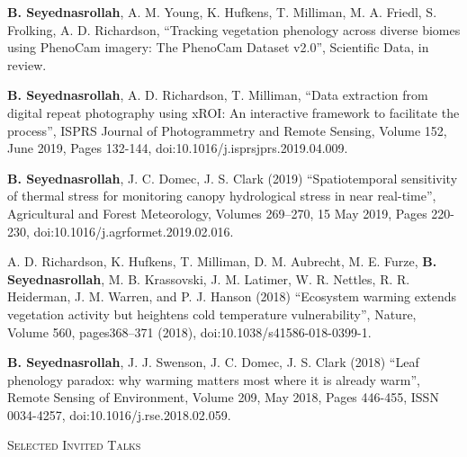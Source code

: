 \documentclass[10pt]{article}
\newenvironment{changemargin}[2]{%
  \begin{list}{}{%
 \setlength{\topsep}{0pt}%
 \setlength{\leftmargin}{#1}%
 \setlength{\rightmargin}{#2}%
 \setlength{\listparindent}{\parindent}%
 \setlength{\itemindent}{\parindent}%
 \setlength{\parsep}{\parskip}%
  }%
  \item[]}{\end{list}
}
\newcommand{\lineover}{
  \begin{changemargin}{-0.05in}{-0.05in}
  \vspace*{-8pt}
  \hrulefill \\
  \vspace*{-2pt}
  \end{changemargin}
}
\newcommand{\header}[1]{
  \begin{changemargin}{-0.5in}{-0.5in}
  \scshape{#1}\\
  \lineover
  \end{changemargin}
}
\newenvironment{body} {
  \vspace*{-2pt}
  \begin{changemargin}{-0.5in}{-0.5in}
}
{\end{changemargin}
}
\begin{document}
\begin{body}

 \textbf{B. Seyednasrollah}, A. M. Young, K. Hufkens, T. Milliman, M. A. Friedl, S. Frolking, A. D. Richardson, ``Tracking vegetation phenology across diverse biomes using PhenoCam imagery: The PhenoCam Dataset v2.0'', Scientific Data, in review.\\
    \smallskip

\textbf{B. Seyednasrollah}, A. D. Richardson, T. Milliman, ``Data extraction from digital repeat photography using xROI: An interactive framework to facilitate the process'', ISPRS Journal of Photogrammetry and Remote Sensing, Volume 152, June 2019, Pages 132-144, doi:10.1016/j.isprsjprs.2019.04.009.\\
    \smallskip


\textbf{B. Seyednasrollah}, J. C. Domec, J. S. Clark (2019) ``Spatiotemporal sensitivity of thermal stress for monitoring canopy hydrological stress in near real-time'', Agricultural and Forest Meteorology, Volumes 269–270, 15 May 2019, Pages 220-230, doi:10.1016/j.agrformet.2019.02.016.\\
    \smallskip

A. D. Richardson, K. Hufkens, T. Milliman, D. M. Aubrecht, M. E. Furze, \textbf{B. Seyednasrollah}, M. B. Krassovski, J. M. Latimer, W. R. Nettles, R. R. Heiderman, J. M. Warren, and P. J. Hanson (2018) ``Ecosystem warming extends vegetation activity but heightens cold temperature vulnerability'', Nature, Volume 560, pages368–371 (2018), doi:10.1038/s41586-018-0399-1.\\
    \smallskip

\textbf{B. Seyednasrollah}, J. J. Swenson, J. C. Domec, J. S. Clark (2018) ``Leaf phenology paradox: why warming matters most where it is already warm'', Remote Sensing of Environment, Volume 209, May 2018, Pages 446-455, ISSN 0034-4257, doi:10.1016/j.rse.2018.02.059.\\

\end{body}

\smallskip

\header{Selected Invited Talks}
\end{document}
